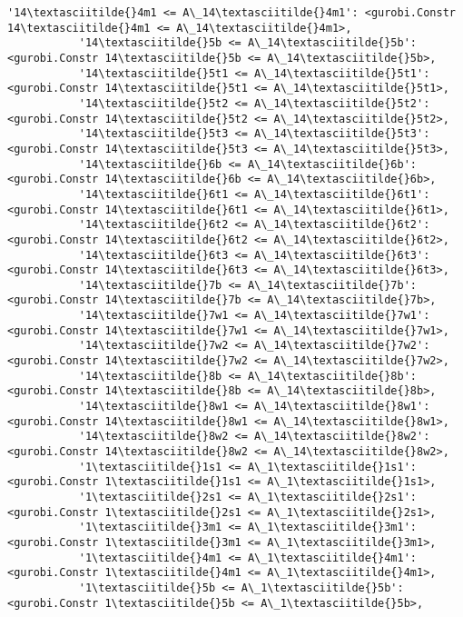 \documentclass[11pt]{article}
\begin{document}
\begin{Verbatim}[commandchars=\\\{\}]
           '14\textasciitilde{}4m1 <= A\_14\textasciitilde{}4m1': <gurobi.Constr 14\textasciitilde{}4m1 <= A\_14\textasciitilde{}4m1>,
           '14\textasciitilde{}5b <= A\_14\textasciitilde{}5b': <gurobi.Constr 14\textasciitilde{}5b <= A\_14\textasciitilde{}5b>,
           '14\textasciitilde{}5t1 <= A\_14\textasciitilde{}5t1': <gurobi.Constr 14\textasciitilde{}5t1 <= A\_14\textasciitilde{}5t1>,
           '14\textasciitilde{}5t2 <= A\_14\textasciitilde{}5t2': <gurobi.Constr 14\textasciitilde{}5t2 <= A\_14\textasciitilde{}5t2>,
           '14\textasciitilde{}5t3 <= A\_14\textasciitilde{}5t3': <gurobi.Constr 14\textasciitilde{}5t3 <= A\_14\textasciitilde{}5t3>,
           '14\textasciitilde{}6b <= A\_14\textasciitilde{}6b': <gurobi.Constr 14\textasciitilde{}6b <= A\_14\textasciitilde{}6b>,
           '14\textasciitilde{}6t1 <= A\_14\textasciitilde{}6t1': <gurobi.Constr 14\textasciitilde{}6t1 <= A\_14\textasciitilde{}6t1>,
           '14\textasciitilde{}6t2 <= A\_14\textasciitilde{}6t2': <gurobi.Constr 14\textasciitilde{}6t2 <= A\_14\textasciitilde{}6t2>,
           '14\textasciitilde{}6t3 <= A\_14\textasciitilde{}6t3': <gurobi.Constr 14\textasciitilde{}6t3 <= A\_14\textasciitilde{}6t3>,
           '14\textasciitilde{}7b <= A\_14\textasciitilde{}7b': <gurobi.Constr 14\textasciitilde{}7b <= A\_14\textasciitilde{}7b>,
           '14\textasciitilde{}7w1 <= A\_14\textasciitilde{}7w1': <gurobi.Constr 14\textasciitilde{}7w1 <= A\_14\textasciitilde{}7w1>,
           '14\textasciitilde{}7w2 <= A\_14\textasciitilde{}7w2': <gurobi.Constr 14\textasciitilde{}7w2 <= A\_14\textasciitilde{}7w2>,
           '14\textasciitilde{}8b <= A\_14\textasciitilde{}8b': <gurobi.Constr 14\textasciitilde{}8b <= A\_14\textasciitilde{}8b>,
           '14\textasciitilde{}8w1 <= A\_14\textasciitilde{}8w1': <gurobi.Constr 14\textasciitilde{}8w1 <= A\_14\textasciitilde{}8w1>,
           '14\textasciitilde{}8w2 <= A\_14\textasciitilde{}8w2': <gurobi.Constr 14\textasciitilde{}8w2 <= A\_14\textasciitilde{}8w2>,
           '1\textasciitilde{}1s1 <= A\_1\textasciitilde{}1s1': <gurobi.Constr 1\textasciitilde{}1s1 <= A\_1\textasciitilde{}1s1>,
           '1\textasciitilde{}2s1 <= A\_1\textasciitilde{}2s1': <gurobi.Constr 1\textasciitilde{}2s1 <= A\_1\textasciitilde{}2s1>,
           '1\textasciitilde{}3m1 <= A\_1\textasciitilde{}3m1': <gurobi.Constr 1\textasciitilde{}3m1 <= A\_1\textasciitilde{}3m1>,
           '1\textasciitilde{}4m1 <= A\_1\textasciitilde{}4m1': <gurobi.Constr 1\textasciitilde{}4m1 <= A\_1\textasciitilde{}4m1>,
           '1\textasciitilde{}5b <= A\_1\textasciitilde{}5b': <gurobi.Constr 1\textasciitilde{}5b <= A\_1\textasciitilde{}5b>,

\end{Verbatim}
\end{document}

